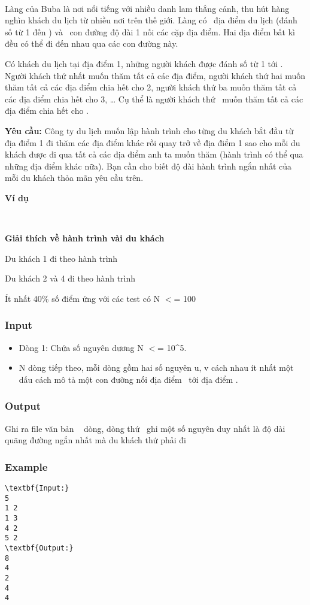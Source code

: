 

 

Làng của Buba là nơi nổi tiếng với nhiều danh lam thắng cảnh, thu hút hàng nghìn khách du lịch từ nhiều nơi trên thế giới. Làng có  địa điểm du lịch (đánh số từ 1 đến ) và  con đường độ dài 1 nối các cặp địa điểm. Hai địa điểm bất kì đều có thể đi đến nhau qua các con đường này.

Có khách du lịch tại địa điểm 1, những người khách được đánh số từ 1 tới . Người khách thứ nhất muốn thăm tất cả các địa điểm, người khách thứ hai muốn thăm tất cả các địa điểm chia hết cho 2, người khách thứ ba muốn thăm tất cả các địa điểm chia hết cho 3, … Cụ thể là người khách thứ  muốn thăm tất cả các địa điểm chia hết cho .

\textbf{Yêu cầu: } Công ty du lịch muốn lập hành trình cho từng du khách bắt đầu từ địa điểm 1 đi thăm các địa điểm khác rồi quay trở về địa điểm 1 sao cho mỗi du khách được đi qua tất cả các địa điểm anh ta muốn thăm (hành trình có thể qua những địa điểm khác nữa). Bạn cần cho biết độ dài hành trình ngắn nhất của mỗi du khách thỏa mãn yêu cầu trên.

\textbf{Ví dụ }

 

\textbf{Giải thích về hành trình vài du khách }

Du khách 1 đi theo hành trình \textbf{}

Du khách 2 và 4 đi theo hành trình

Ít nhất 40\% số điểm ứng với các test có N $<$= 100

\subsubsection{Input}
\begin{itemize}
	\item Dòng 1: Chứa số nguyên dương N $<$= 10\textasciicircum5.
	\item N dòng tiếp theo, mỗi dòng gồm hai số nguyên u, v cách nhau ít nhất một dấu cách mô tả một con đường nối địa điểm  tới địa điểm .
\end{itemize}

\subsubsection{Output}

Ghi ra file văn bản   dòng, dòng thứ  ghi một số nguyên duy nhất là độ dài quãng đường ngắn nhất mà du khách thứ phải đi

\subsubsection{Example}
\begin{verbatim}
\textbf{Input:}
5
1 2
1 3
4 2
5 2
\textbf{Output:}
8
4
2
4
4\end{verbatim}